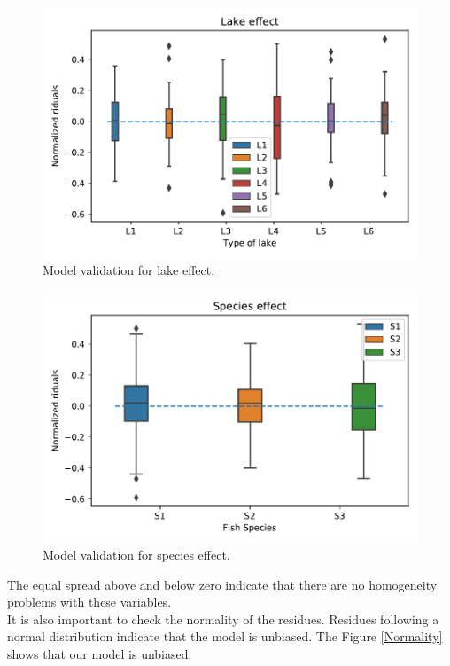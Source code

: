 \documentclass{article}
\begin{document}
\begin{figure}[h!]
    \centering
    \includegraphics[scale=0.7]{images/boxplot_mod_vali_lake.pdf}
    \caption{Model validation for lake effect.}
    \label{md_val_lake}
\end{figure}
\begin{figure}[h!]
    \centering
    \includegraphics[scale=0.7]{images/boxplot_mod_vali_species.pdf}
    \caption{Model validation for species effect.}
    \label{md_val_species}
\end{figure}

The equal spread above and below zero indicate that there are no homogeneity problems with these variables.\\
It is also important to check the normality of the residues. Residues following a normal distribution indicate that the model is unbiased. The Figure \ref{Normality} shows that our model is unbiased.
\end{document}

